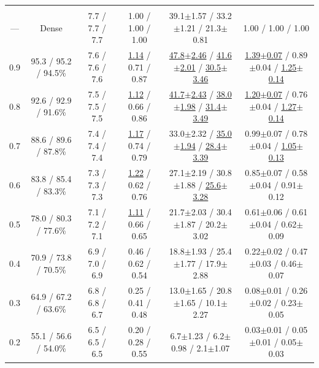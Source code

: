 \begin{table}[!t]
\begin{tabular}{c c c c c c}
\midrule
\rowcolor{lightgray} \multicolumn{6}{c}{\rule{0pt}{2.2ex}\textbf{LLaMA-3.1-8B}\rule[-0.8ex]{0pt}{0pt}} \\
--- & Dense & 7.7 / 7.7 / 7.7 & 1.00 / 1.00 / 1.00 & 39.1{\scriptsize$\pm$1.57} / 33.2{\scriptsize$\pm$1.21} / 21.3{\scriptsize$\pm$0.81} & 1.00 / 1.00 / 1.00 \\
0.9 & 95.3 / 95.2 / 94.5\% & 7.6 / 7.6 / 7.6 & \underline{1.14} / 0.71 / 0.87 & \underline{47.8{\scriptsize$\pm$2.46}} / \underline{41.6{\scriptsize$\pm$2.01}} / \underline{30.5{\scriptsize$\pm$3.46}} & \underline{1.39{\scriptsize$\pm$0.07}} / 0.89{\scriptsize$\pm$0.04} / \underline{1.25{\scriptsize$\pm$0.14}} \\
0.8 & 92.6 / 92.9 / 91.6\% & 7.5 / 7.5 / 7.5 & \underline{1.12} / 0.66 / 0.86 & \underline{41.7{\scriptsize$\pm$2.43}} / \underline{38.0{\scriptsize$\pm$1.98}} / \underline{31.4{\scriptsize$\pm$3.49}} & \underline{1.20{\scriptsize$\pm$0.07}} / 0.76{\scriptsize$\pm$0.04} / \underline{1.27{\scriptsize$\pm$0.14}} \\
0.7 & 88.6 / 89.6 / 87.8\% & 7.4 / 7.4 / 7.4 & \underline{1.17} / 0.74 / 0.79 & 33.0{\scriptsize$\pm$2.32} / \underline{35.0{\scriptsize$\pm$1.94}} / \underline{28.4{\scriptsize$\pm$3.39}} & 0.99{\scriptsize$\pm$0.07} / 0.78{\scriptsize$\pm$0.04} / \underline{1.05{\scriptsize$\pm$0.13}} \\
0.6 & 83.8 / 85.4 / 83.3\% & 7.3 / 7.3 / 7.3 & \underline{1.22} / 0.62 / 0.76 & 27.1{\scriptsize$\pm$2.19} / 30.8{\scriptsize$\pm$1.88} / \underline{25.6{\scriptsize$\pm$3.28}} & 0.85{\scriptsize$\pm$0.07} / 0.58{\scriptsize$\pm$0.04} / 0.91{\scriptsize$\pm$0.12} \\
0.5 & 78.0 / 80.3 / 77.6\% & 7.1 / 7.2 / 7.1 & \underline{1.11} / 0.66 / 0.65 & 21.7{\scriptsize$\pm$2.03} / 30.4{\scriptsize$\pm$1.87} / 20.2{\scriptsize$\pm$3.02} & 0.61{\scriptsize$\pm$0.06} / 0.61{\scriptsize$\pm$0.04} / 0.62{\scriptsize$\pm$0.09} \\
0.4 & 70.9 / 73.8 / 70.5\% & 6.9 / 7.0 / 6.9 & 0.46 / 0.62 / 0.54 & 18.8{\scriptsize$\pm$1.93} / 25.4{\scriptsize$\pm$1.77} / 17.9{\scriptsize$\pm$2.88} & 0.22{\scriptsize$\pm$0.02} / 0.47{\scriptsize$\pm$0.03} / 0.46{\scriptsize$\pm$0.07} \\
0.3 & 64.9 / 67.2 / 63.6\% & 6.8 / 6.8 / 6.7 & 0.25 / 0.41 / 0.48 & 13.0{\scriptsize$\pm$1.65} / 20.8{\scriptsize$\pm$1.65} / 10.1{\scriptsize$\pm$2.27} & 0.08{\scriptsize$\pm$0.01} / 0.26{\scriptsize$\pm$0.02} / 0.23{\scriptsize$\pm$0.05} \\
0.2 & 55.1 / 56.6 / 54.0\% & 6.5 / 6.5 / 6.5 & 0.20 / 0.28 / 0.55 & 6.7{\scriptsize$\pm$1.23} / 6.2{\scriptsize$\pm$0.98} / 2.1{\scriptsize$\pm$1.07} & 0.03{\scriptsize$\pm$0.01} / 0.05{\scriptsize$\pm$0.01} / 0.05{\scriptsize$\pm$0.03} \\

\end{tabular}
\end{table}
